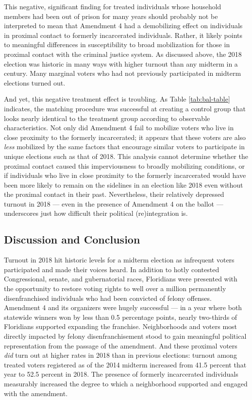 \documentclass[
  12pt,
]{article}
\begin{document}
This negative, significant finding for treated individuals whose household members had been out of prison for many years should probably not be interpreted to mean that Amendment 4 had a demobilizing effect on individuals in proximal contact to formerly incarcerated individuals. Rather, it likely points to meaningful differences in susceptibility to broad mobilization for those in proximal contact with the criminal justice system. As discussed above, the 2018 election was historic in many ways with higher turnout than any midterm in a century. Many marginal voters who had not previously participated in midterm elections turned out.

And yet, this negative treatment effect is troubling. As Table \ref{tab:bal-table} indicates, the matching procedure was successful at creating a control group that looks nearly identical to the treatment group according to observable characteristics. Not only did Amendment 4 fail to mobilize voters who live in close proximity to the formerly incarcerated; it appears that these voters are also \emph{less} mobilized by the same factors that encourage similar voters to participate in unique elections such as that of 2018. This analysis cannot determine whether the proximal contact caused this imperviousness to broadly mobilizing conditions, or if individuals who live in close proximity to the formerly incarcerated would have been more likely to remain on the sidelines in an election like 2018 even without the proximal contact in their past. Nevertheless, their relatively depressed turnout in 2018 --- even in the presence of Amendment 4 on the ballot --- underscores just how difficult their political (re)integration is.

\hypertarget{discussion-and-conclusion}{%
\subsection*{Discussion and Conclusion}\label{discussion-and-conclusion}}

Turnout in 2018 hit historic levels for a midterm election as infrequent voters participated and made their voices heard. In addition to hotly contested Congressional, senate, and gubernatorial races, Floridians were presented with the opportunity to restore voting rights to well over a million permanently disenfranchised individuals who had been convicted of felony offenses. Amendment 4 and its organizers were hugely successful --- in a year where both statewide winners won by less than 0.5 percentage points, nearly two-thirds of Floridians supported expanding the franchise. Neighborhoods and voters most directly impacted by felony disenfranchisement stood to gain meaningful political representation from the passage of the amendment. And these proximal voters \emph{did} turn out at higher rates in 2018 than in previous elections: turnout among treated voters registered as of the 2014 midterm increased from 41.5 percent that year to 52.5 percent in 2018. The presence of formerly incarcerated individuals measurably increased the degree to which a neighborhood supported and engaged with the amendment.
\end{document}

